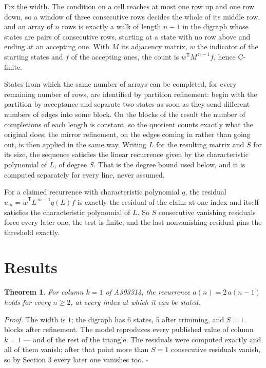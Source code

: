\documentclass[11pt]{article}
\newtheorem{theorem}{Theorem}
\theoremstyle{definition}
\begin{document}
Fix the width. The condition on a cell reaches at most one row up and one row down, so a window of three consecutive rows decides the whole of its middle row, and an array of $n$ rows is exactly a walk of length $n-1$ in the digraph whose states are pairs of consecutive rows, starting at a state with no row above and ending at an accepting one. With $M$ its adjacency matrix, $w$ the indicator of the starting states and $f$ of the accepting ones, the count is $w^{\mathsf T}M^{\,n-1}f$, hence C-finite.

States from which the same number of arrays can be completed, for every remaining number of rows, are identified by partition refinement: begin with the partition by acceptance and separate two states as soon as they send different numbers of edges into some block. On the blocks of the result the number of completions of each length is constant, so the quotient counts exactly what the original does; the mirror refinement, on the edges coming in rather than going out, is then applied in the same way. Writing $L$ for the resulting matrix and $S$ for its size, the sequence satisfies the linear recurrence given by the characteristic polynomial of $L$, of degree $S$. That is the degree bound used below, and it is computed separately for every line, never assumed.

For a claimed recurrence with characteristic polynomial $q$, the residual $u_m = \tilde w^{\mathsf T}L^{\,m-1}q(L)\tilde f$ is exactly the residual of the claim at one index and itself satisfies the characteristic polynomial of $L$. So $S$ consecutive vanishing residuals force every later one, the test is finite, and the last nonvanishing residual pins the threshold exactly.

\section{Results}

\begin{theorem} For column $k = 1$ of A303314, the recurrence $a(n) = 2\,a(n-1)$ holds for every $n \ge 2$, at every index at which it can be stated.\end{theorem}

{\itshape Proof.} The width is $1$; the digraph has $6$ states, $5$ after trimming, and $S = 1$ blocks after refinement. The model reproduces every published value of column $k = 1$ --- and of the rest of the triangle. The residuals were computed exactly and all of them vanish; after that point more than $S = 1$ consecutive residuals vanish, so by Section 3 every later one vanishes too. $\square$
\end{document}

